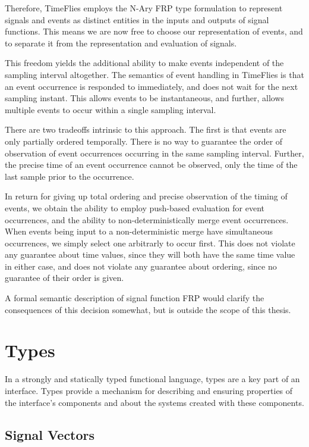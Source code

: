 Therefore, TimeFlies employs the N-Ary FRP type formulation to represent signals and
events as distinct entities in the inputs and outputs of signal functions. This means
we are now free to choose our representation of events, and to separate it from the
representation and evaluation of signals.

This freedom yields the additional ability to make events independent of the sampling
interval altogether. The semantics of event handling in TimeFlies is that an event occurrence
is responded to immediately, and does not wait for the next sampling instant. This allows events
to be instantaneous, and further, allows multiple events to occur within a single sampling interval.

There are two tradeoffs intrinsic to this approach. The first is that events are only partially ordered
temporally. There is no way to guarantee the order of observation of event occurrences occurring in the
same sampling interval. Further, the precise time of an event occurrence cannot be observed, only the 
time of the last sample prior to the occurrence.

In return for giving up total ordering and precise observation of the timing of events, we obtain the
ability to employ push-based evaluation for event occurrences, and the ability to non-deterministically
merge event occurrences. When events being input to a non-deterministic merge have simultaneous occurrences,
we simply select one arbitrarly to occur first. This does not violate any guarantee about time values, since
they will both have the same time value in either case, and does not violate any guarantee about ordering,
since no guarantee of their order is given.

A formal semantic description of signal function FRP would clarify the consequences of this decision somewhat,
but is outside the scope of this thesis.

\section{Types}
\label{section:System_Design_and_Interface-Types}

In a strongly and statically typed functional language, types are a key part of
an interface. Types provide a mechanism for describing and ensuring properties
of the interface's components and about the systems created with these
components. 

\subsection{Signal Vectors}
\label{subsection:System_Design_and_Interface-Types-Signal_Vectors}

